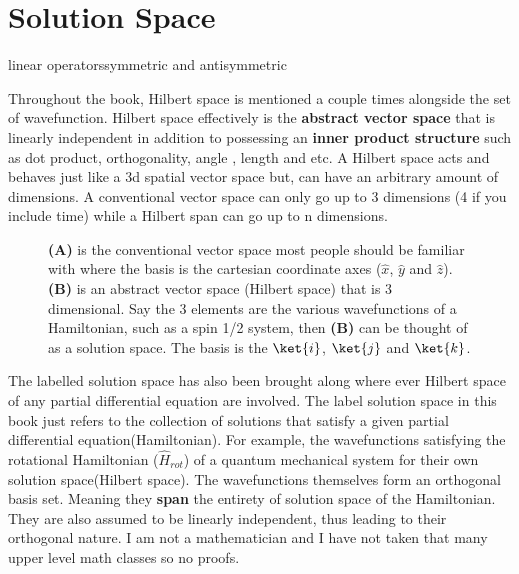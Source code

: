 \documentclass[11pt,a4paper]{book}
\newcommand{\imginput}[1]{} %
\begin{document}
	\section{Solution Space}
		\label{sec:Solution Space}
		linear operatorssymmetric and antisymmetric
		
		Throughout the book, Hilbert space is mentioned a couple times alongside the set of  wavefunction. Hilbert space effectively is the \textbf{abstract vector space} that is linearly independent in addition to possessing an \textbf{inner product structure} such as dot product, orthogonality, angle , length and etc. A Hilbert space acts and behaves just like a 3d spatial vector space but, can have an arbitrary amount of dimensions. A conventional vector space can only go up to 3 dimensions (4 if you include time) while a Hilbert span can go up to n dimensions.
		
		\begin{figure} [!ht]
			\centering
			\def\svgwidth{\columnwidth}
			\resizebox{160mm}{!}{\imginput{images/euclidean-hillbert.pdf_tex}}
			\caption{\textbf{(A)} is the conventional vector space most people should be familiar with where the basis is the cartesian coordinate axes ($\hat{x}$, $\hat{y}$ and  $\hat{z}$).\\
				\textbf{(B)} is an abstract vector space  (Hilbert space) that is 3 dimensional. Say the 3 elements are the various wavefunctions of a Hamiltonian, such as a spin 1/2 system, then \textbf{(B)} can be thought of as a solution space. The basis is the $\ket{i}$, $\ket{j}$ and $\ket{k}$.
			}
			\label{fig:cav-typaaaes}
		\end{figure}	
		
		The labelled solution space has also been brought along where ever Hilbert space of any partial differential equation are involved. The label solution space in this book just refers to the collection of solutions that satisfy a given partial differential equation(Hamiltonian). For example, the wavefunctions satisfying the rotational Hamiltonian ($\hat{H}_{rot}$) of a quantum mechanical system for their own solution space(Hilbert space). The wavefunctions themselves form an orthogonal basis set. Meaning they \textbf{span} the entirety of solution space of the Hamiltonian. They are also assumed to be linearly independent, thus leading to their orthogonal nature. I am not a mathematician and I have not taken that many upper level math classes so no proofs.
		
\end{document}
